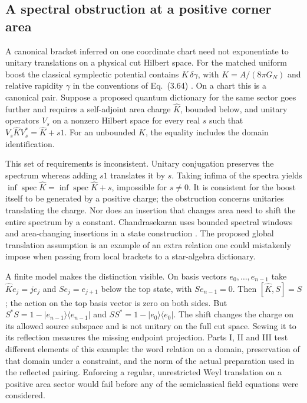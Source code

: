 \documentclass[11pt,letterpaper]{article}
\begin{document}
\subsection{A spectral obstruction at a positive corner area}
A canonical bracket inferred on one coordinate chart need not
exponentiate to unitary translations on a physical cut Hilbert space.
For the matched uniform boost the classical symplectic potential
contains \(K\,\delta\gamma\), with \(K=A/(8\pi G_N)\) and relative
rapidity \(\gamma\) in the conventions of Eq.~(3.64)
\cite{nc}. On a chart this is a canonical pair. Suppose a proposed
quantum dictionary for the same sector goes further and requires a
self-adjoint area charge \(\widehat K\), bounded below, and unitary
operators \(V_s\) on a nonzero Hilbert space for every real \(s\)
such that \(V_s\widehat K V_s^*=\widehat K+s1\).
For an unbounded \(\widehat K\), the equality includes the domain
identification.

This set of requirements is inconsistent. Unitary conjugation preserves
the spectrum whereas adding \(s1\) translates it by \(s\).
Taking infima of the spectra yields
\(\inf\operatorname{spec}\widehat K=
\inf\operatorname{spec}\widehat K+s\), impossible for \(s\ne0\).
It is consistent for the boost itself to be generated by a positive
charge; the obstruction concerns unitaries translating the charge.
Nor does an insertion that changes area need to shift the entire
spectrum by a constant. Chandrasekaran uses bounded spectral windows
and area-changing insertions in a state construction
\cite[Secs.~4.2--4.3]{nc}. The proposed global translation assumption
is an example of an extra relation one could mistakenly impose when
passing from local brackets to a star-algebra dictionary.

A finite model makes the distinction visible. On basis vectors
\(e_0,\ldots,e_{n-1}\) take \(\widehat K e_j=j e_j\) and
\(S e_j=e_{j+1}\) below the top state, with \(S e_{n-1}=0\).
Then \([\widehat K,S]=S\); the action on the top basis vector is zero
on both sides. But \(S^*S=1-|e_{n-1}\rangle\langle e_{n-1}|\) and
\(SS^*=1-|e_0\rangle\langle e_0|\).
The shift changes the charge on its allowed source subspace and is not
unitary on the full cut space. Sewing it to its reflection measures the
missing endpoint projection. Parts I, II and III test different elements
of this example: the word relation on a domain, preservation of that
domain under a constraint, and the norm of the actual preparation used
in the reflected pairing. Enforcing a regular, unrestricted Weyl
translation on a positive area sector would fail before any of the
semiclassical field equations were considered.
\end{document}
